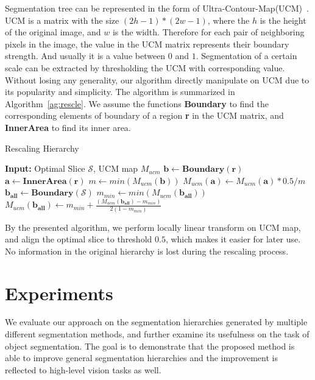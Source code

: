Segmentation tree can be represented in the form of
Ultra-Contour-Map(UCM)~\cite{arbelaez2011contour}. UCM is a matrix
with the size $(2h-1)*(2w-1)$, where the $h$ is the height of the
original image, and $w$ is the width. Therefore for each pair of
neighboring pixels in the image, the value in the UCM matrix
represents their boundary strength. And usually it is a value between
$0$ and $1$. Segmentation of a certain scale can be extracted by
thresholding the UCM with corresponding value. Without losing any
generality, our algorithm directly manipulate on UCM due to its
popularity and simplicity. The algorithm is summarized in
Algorithm~\ref{ag:rescle}. We assume the functions \textbf{Boundary}
to find the corresponding elements of boundary of a region \textbf{r}
in the UCM matrix, and \textbf{InnerArea} to find its inner area.

\begin{algorithm} [tb]
\caption{Rescaling Hierarchy}
\label{ag:rescle}
\begin{algorithmic}
\STATE \textbf{Input:} Optimal Slice $\mathcal{S}$, UCM map $M_{ucm}$
\STATE $\textbf{b} \gets \textbf{Boundary}(\textbf{r})$
\STATE $\textbf{a} \gets \textbf{InnerArea}(\textbf{r})$
\STATE $m \gets min(M_{ucm}(\textbf{b}))$
\STATE $M_{ucm}(\textbf{a}) \gets M_{ucm}(\textbf{a})*0.5/m$
\ENDFOR
\STATE $ \textbf{b}_{\textbf{all}} \gets \textbf{Boundary}(\mathcal{S})$
\STATE $m_{min} \gets min(M_{ucm}(\textbf{b}_{\textbf{all}}))$
\STATE $M_{ucm}(\textbf{b}_{\textbf{all}}) \gets m_{min} + \frac{(M_{ucm}(\textbf{b}_{\textbf{all}})-m_{min})}{2(1-m_{min})}$
\end{algorithmic}
\end{algorithm}

By the presented algorithm, we perform locally linear transform on UCM map, and align the optimal slice to threshold $0.5$, which makes it easier for later use. No information in the original hierarchy is lost during the rescaling process. 




\section{Experiments}
\label{sec:experiments}
We evaluate our approach on the segmentation hierarchies generated by
multiple different segmentation methods, and further examine its
usefulness on the task of object segmentation. The goal is to
demonstrate that the proposed method is able to improve general
segmentation hierarchies and the improvement is reflected to
high-level vision tasks as well.

